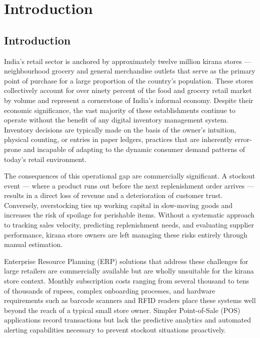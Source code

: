 \chapter{Introduction}
\label{ch:intro}

\section{Introduction}

India's retail sector is anchored by approximately twelve million kirana stores — neighbourhood
grocery and general merchandise outlets that serve as the primary point of purchase for a large
proportion of the country's population. These stores collectively account for over ninety percent
of the food and grocery retail market by volume and represent a cornerstone of India's informal
economy. Despite their economic significance, the vast majority of these establishments continue
to operate without the benefit of any digital inventory management system. Inventory decisions are
typically made on the basis of the owner's intuition, physical counting, or entries in paper
ledgers, practices that are inherently error-prone and incapable of adapting to the dynamic
consumer demand patterns of today's retail environment.

The consequences of this operational gap are commercially significant. A stockout event — where
a product runs out before the next replenishment order arrives — results in a direct loss of
revenue and a deterioration of customer trust. Conversely, overstocking ties up working capital
in slow-moving goods and increases the risk of spoilage for perishable items. Without a
systematic approach to tracking sales velocity, predicting replenishment needs, and evaluating
supplier performance, kirana store owners are left managing these risks entirely through manual
estimation.

Enterprise Resource Planning (ERP) solutions that address these challenges for large retailers
are commercially available but are wholly unsuitable for the kirana store context. Monthly
subscription costs ranging from several thousand to tens of thousands of rupees, complex
onboarding processes, and hardware requirements such as barcode scanners and RFID readers place
these systems well beyond the reach of a typical small store owner. Simpler Point-of-Sale (POS)
applications record transactions but lack the predictive analytics and automated alerting
capabilities necessary to prevent stockout situations proactively.

